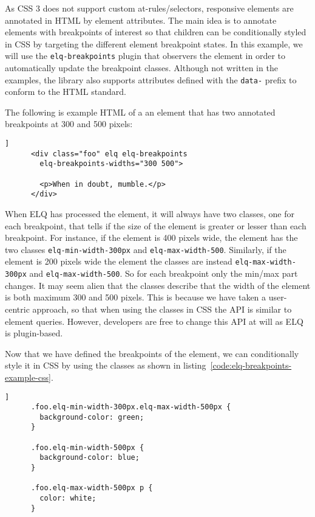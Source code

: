 \documentclass{acm_proc_article-sp}
\newcommand{\code}[1]{\texttt{#1}}
\newcommand{\elq}{ELQ}
\begin{document}
    As CSS 3 does not support custom at-rules/selectors, responsive elements are annotated in HTML by element attributes.
    The main idea is to annotate elements with breakpoints of interest so that children can be conditionally styled in CSS by targeting the different element breakpoint states.
    In this example, we will use the \code{elq-breakpoints} plugin that observers the element in order to automatically update the breakpoint classes.
    Although not written in the examples, the library also supports attributes defined with the \code{data-} prefix to conform to the HTML standard.

    The following is example HTML of a an element that has two annotated breakpoints at 300 and 500 pixels:

    \begin{lstlisting}[gobble=6,caption={},captionpos=b,label={}]]
      <div class="foo" elq elq-breakpoints
        elq-breakpoints-widths="300 500">
        
        <p>When in doubt, mumble.</p>
      </div>
    \end{lstlisting}

    When \elq{} has processed the element, it will always have two classes, one for each breakpoint, that tells if the size of the element is greater or lesser than each breakpoint.
    For instance, if the element is 400 pixels wide, the element has the two classes \code{elq-min-width-300px} and \code{elq-max-width-500}.
    Similarly, if the element is 200 pixels wide the element the classes are instead \code{elq-max-width-300px} and \code{elq-max-width-500}.
    So for each breakpoint only the min/max part changes.
    It may seem alien that the classes describe that the width of the element is both maximum 300 and 500 pixels.
    This is because we have taken a user-centric approach, so that when using the classes in CSS the API is similar to element queries.
    However, developers are free to change this API at will as \elq{} is plugin-based.

    Now that we have defined the breakpoints of the element, we can conditionally style it in CSS by using the classes as shown in listing~\ref{code:elq-breakpoints-example-css}.

    \begin{lstlisting}[gobble=6,caption={Example usage of the breakpoint state classes in CSS.},captionpos=b,label={code:elq-breakpoints-example-css}]]
      .foo.elq-min-width-300px.elq-max-width-500px {
        background-color: green;
      }

      .foo.elq-min-width-500px {
        background-color: blue;
      }

      .foo.elq-max-width-500px p {
        color: white;
      }
    \end{lstlisting}
\end{document}
